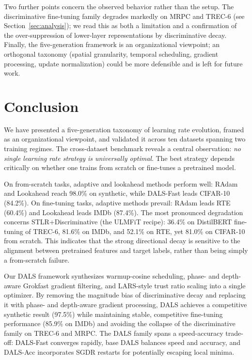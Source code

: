 \documentclass[a4paper,fleqn]{cas-dc}
\begin{document}
Two further points concern the observed behavior rather than the setup. The discriminative fine-tuning family degrades markedly on MRPC and TREC-6 (see Section~\mbox{\ref{sec:analysis}}); we read this as both a limitation and a confirmation of the over-suppression of lower-layer representations by discriminative decay. Finally, the five-generation framework is an organizational viewpoint; an orthogonal taxonomy (spatial granularity, temporal scheduling, gradient processing, update normalization) could be more defensible and is left for future work.

\section{Conclusion}\label{sec:conclusion}

We have presented a five-generation taxonomy of learning rate evolution, framed as an organizational viewpoint, and validated it across ten datasets spanning two training regimes. The cross-dataset benchmark reveals a central observation: \emph{no single learning rate strategy is universally optimal}. The best strategy depends critically on whether one trains from scratch or fine-tunes a pretrained model.

On from-scratch tasks, adaptive and lookahead methods perform well: RAdam and Lookahead reach 98.0\% on synthetic, while DALS-Fast leads CIFAR-10 (84.2\%). On fine-tuning tasks, adaptive methods prevail: RAdam leads RTE (60.4\%) and Lookahead leads IMDb (87.4\%). The most pronounced degradation concerns STLR+Discriminative (the ULMFiT recipe): 36.4\% on DistilBERT fine-tuning of TREC-6, 81.6\% on IMDb, and 52.1\% on RTE, yet 81.0\% on CIFAR-10 from scratch. This indicates that the strong directional decay is sensitive to the alignment between pretrained features and target labels, rather than being simply a from-scratch failure.

Our DALS framework synthesizes warmup-cosine scheduling, phase- and depth-aware Grokfast gradient filtering, and LARS-style trust ratio scaling into a single optimizer. By removing the magnitude bias of discriminative decay and replacing it with phase- and depth-aware gradient processing, DALS achieves a competitive synthetic result (97.5\%) while maintaining stable, competitive fine-tuning performance (85.9\% on IMDb) and avoiding the collapse of the discriminative family on TREC-6 and MRPC. The DALS family spans a speed-accuracy trade-off: DALS-Fast converges rapidly, base DALS balances speed and accuracy, and DALS-Acc incorporates SGDR restarts for potentially escaping local minima.
\end{document}
